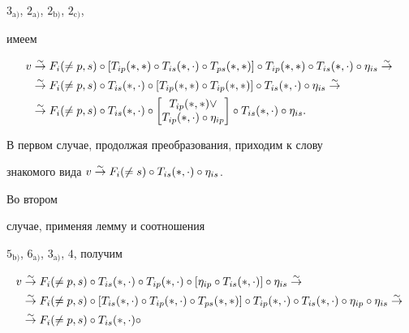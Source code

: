 \begin{pf}
$3_{\mathrm a)}$, $2_{\mathrm a)}$, $2_{\mathrm b)}$, $2_{\mathrm c)}$, 


имеем 


\begin{align*} 


v&\simto F_i(\ne p,s)\circ[T_{ip}(*,*)\circ T_{is}(*,\cdot)\circ 


T_{ps}(*,*)]\circ T_{ip}(*,*)\circ T_{is}(*,\cdot) 


\circ\eta_{is}\simto \\ 


&\simto F_i(\ne p,s)\circ T_{is}(*,\cdot)\circ 


[T_{ip}(*,*)\circ T_{ip}(*,*)]\circ 


T_{is}(*,\cdot)\circ\eta_{is}\simto \\ 


&\simto F_i(\ne p,s)\circ T_{is}(*,\cdot)\circ 


\begin{bmatrix} 


T_{ip}(*,*)\vee \\ T_{ip}(*,\cdot)\circ\eta_{ip} 


\end{bmatrix} 


\circ T_{is}(*,\cdot)\circ\eta_{is}. 


\end{align*} 


В первом случае, продолжая преобразования, приходим к слову 


знакомого вида $v\overset{\sim}{\to}{} F_i(\ne s)\circ T_{is}(*,\cdot)\circ\eta_{is}$. 


Во втором 


случае, применяя лемму и соотношения 


$5_{\mathrm b)}$, $6_{\mathrm a)}$, $3_{\mathrm a)}$, $4$, получим 


\begin{align*} 


v&\simto F_i(\ne p,s)\circ T_{is}(*,\cdot)\circ T_{ip}(*,\cdot) 


\circ[\eta_{ip}\circ T_{is}(*,\cdot)]\circ\eta_{is}\simto \\ 


&\simto F_i(\ne p,s)\circ[T_{is}(*,\cdot) 


\circ T_{ip}(*,\cdot)\circ T_{ps}(*,*)]\circ T_{ip}(*,\cdot) 


\circ T_{is}(*,\cdot)\circ \eta_{ip}\circ\eta_{is}\simto \\ 


&\simto F_i(\ne p,s)\circ T_{is}(*,\cdot)\circ 



\end{align*}
\end{pf}
